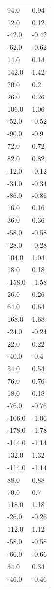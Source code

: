 \begin{longtable}{ll}
94.0 & 0.94 \\
12.0 & 0.12 \\
-42.0 & -0.42 \\
-62.0 & -0.62 \\
14.0 & 0.14 \\
142.0 & 1.42 \\
20.0 & 0.2 \\
26.0 & 0.26 \\
106.0 & 1.06 \\
-52.0 & -0.52 \\
-90.0 & -0.9 \\
72.0 & 0.72 \\
82.0 & 0.82 \\
-12.0 & -0.12 \\
-34.0 & -0.34 \\
-86.0 & -0.86 \\
16.0 & 0.16 \\
36.0 & 0.36 \\
-58.0 & -0.58 \\
-28.0 & -0.28 \\
104.0 & 1.04 \\
18.0 & 0.18 \\
-158.0 & -1.58 \\
26.0 & 0.26 \\
64.0 & 0.64 \\
168.0 & 1.68 \\
-24.0 & -0.24 \\
22.0 & 0.22 \\
-40.0 & -0.4 \\
54.0 & 0.54 \\
76.0 & 0.76 \\
18.0 & 0.18 \\
-76.0 & -0.76 \\
-106.0 & -1.06 \\
-178.0 & -1.78 \\
-114.0 & -1.14 \\
132.0 & 1.32 \\
-114.0 & -1.14 \\
88.0 & 0.88 \\
70.0 & 0.7 \\
118.0 & 1.18 \\
-26.0 & -0.26 \\
112.0 & 1.12 \\
-58.0 & -0.58 \\
-66.0 & -0.66 \\
34.0 & 0.34 \\
-46.0 & -0.46 \\

\end{longtable}

